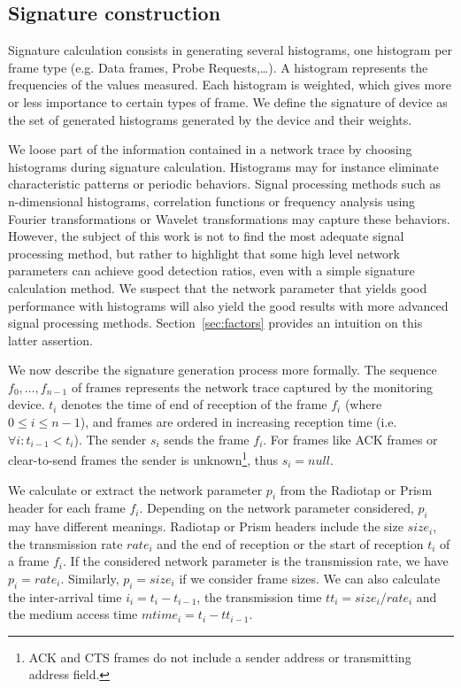 \documentclass[10pt, conference, compsocconf, letterpaper]{IEEEtran}
\begin{document}
\subsection{Signature construction}

Signature calculation consists in generating several histograms, one histogram per frame type (e.g. Data frames, Probe Requests,\ldots). A histogram represents the frequencies of the values measured. Each histogram is weighted, which gives more or less importance to certain types of frame. 
We define the signature of device as the set of generated histograms generated by the device and their weights. 

We loose part of the information contained in a network trace by choosing histograms during signature calculation. Histograms may for instance eliminate characteristic patterns or periodic behaviors. Signal processing methods such as n-dimensional histograms, correlation functions or frequency analysis using Fourier transformations or Wavelet transformations may capture these behaviors. However, the subject of this work is not to find the most adequate signal processing method, but rather to highlight that some high level network parameters can achieve good detection ratios, even with a simple signature calculation method. We suspect that the network parameter that yields good performance with histograms will also yield the good results with more advanced signal processing methods. Section~\ref{sec:factors} provides an intuition on this latter assertion.
 
We now describe the signature generation process more formally. 
The sequence $f_0,\ldots,f_{n-1}$ of frames represents the network trace captured by the monitoring device.
$t_i$ denotes the time of end of reception of the frame $f_i$ (where $0 \le i \le n-1$), and frames are ordered in increasing reception time (i.e. $\forall i: t_{i-1} < t_{i}$). The sender $s_i$ sends the frame $f_i$.
For frames like ACK frames or clear-to-send frames \cite{IEEE:80211} the sender is unknown\footnote{ACK and CTS frames do not include a sender address or transmitting address field.}, thus $s_i = null$.

We calculate or extract the network parameter $p_i$ from the Radiotap or Prism header for each frame $f_i$.
Depending on the network parameter considered, $p_i$ may have different meanings.
Radiotap or Prism headers include the size $size_i$, the transmission rate $rate_i$ and the end of reception or the start of reception $t_{i}$ of a frame $f_i$. If the considered network parameter is the transmission rate, we have $p_i = rate_i$.  Similarly, $p_i=size_i$ if we consider frame sizes. We can also calculate the inter-arrival time $i_i =  t_{i} - t_{i-1}$, the transmission time $tt_i = size_i/rate_i$ and the medium access time $mtime_i = t_{i} - tt_{i-1}$. 
\end{document}
